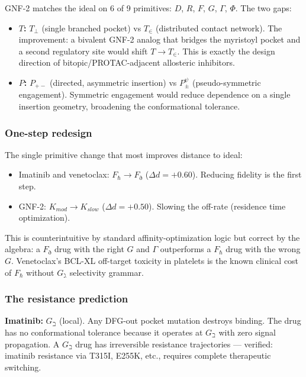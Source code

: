 \documentclass[12pt,a4paper]{article}
\begin{document}
GNF-2 matches the ideal on 6 of 9 primitives: $D$, $R$, $F$, $G$, $\Gamma$, $\Phi$. The two gaps:

\begin{itemize}
    \item \textbf{$T$:} $T_\perp$ (single branched pocket) vs $T_\in$ (distributed contact network). The improvement: a bivalent GNF-2 analog that bridges the myristoyl pocket and a second regulatory site would shift $T \to T_\in$. This is exactly the design direction of bitopic/PROTAC-adjacent allosteric inhibitors.
    \item \textbf{$P$:} $P_{+-}$ (directed, asymmetric insertion) vs $P_\pm^\psi$ (pseudo-symmetric engagement). Symmetric engagement would reduce dependence on a single insertion geometry, broadening the conformational tolerance.
\end{itemize}

\subsubsection{One-step redesign}

The single primitive change that most improves distance to ideal:

\begin{itemize}
    \item Imatinib and venetoclax: $F_\hbar \to F_\eth$ ($\Delta d = +0.60$). Reducing fidelity is the first step.
    \item GNF-2: $K_{mod} \to K_{slow}$ ($\Delta d = +0.50$). Slowing the off-rate (residence time optimization).
\end{itemize}

This is counterintuitive by standard affinity-optimization logic but correct by the algebra: a $F_\eth$ drug with the right $G$ and $\Gamma$ outperforms a $F_\hbar$ drug with the wrong $G$. Venetoclax's BCL-XL off-target toxicity in platelets is the known clinical cost of $F_\hbar$ without $G_\gimel$ selectivity grammar.

\subsubsection{The resistance prediction}

\textbf{Imatinib:} $G_\beth$ (local). Any DFG-out pocket mutation destroys binding. The drug has no conformational tolerance because it operates at $G_\beth$ with zero signal propagation. A $G_\beth$ drug has irreversible resistance trajectories --- verified: imatinib resistance via T315I, E255K, etc., requires complete therapeutic switching.
\end{document}
